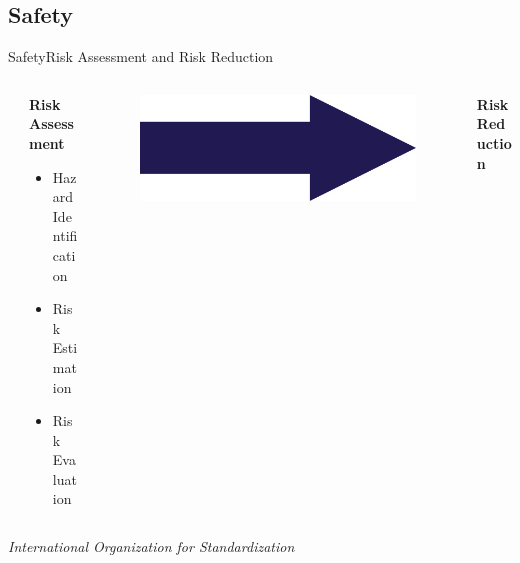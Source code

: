 \subsection{Safety}
\begin{frame}{Safety}{Risk Assessment and Risk Reduction}
\begin{columns}
\begin{column}{0.05\textwidth}
\end{column}
\begin{column}{0.40\textwidth}
\textbf{Risk Assessment}
    \begin{itemize}
        \item Hazard Identification
        \item Risk Estimation
        \item Risk Evaluation     
    \end{itemize}
\end{column}
\begin{column}{0.25\textwidth}
\begin{figure}[]
    \centering
    \includegraphics[width=.9\textwidth]{graphics/andrej/arrow}
    \newline
\end{figure}
\end{column}
\begin{column}{0.3\textwidth}
\textbf{Risk Reduction}
\end{column}
\end{columns}
\vspace{10mm}
\centering
\textit{International Organization for Standardization}
\end{frame}

